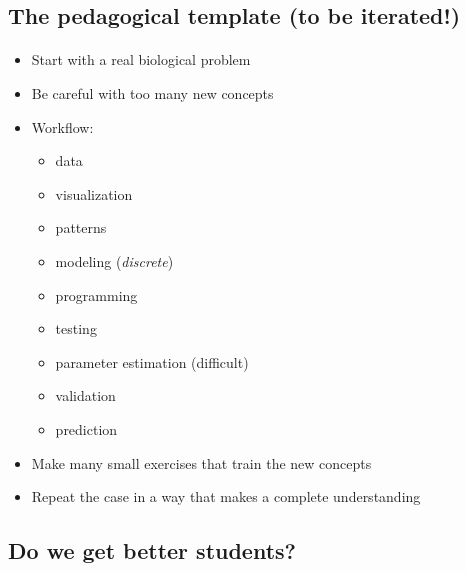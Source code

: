 \documentclass[%
twoside,                 %
final,                   %
10pt]{article}
\begin{document}
\noindent




\subsection*{The pedagogical template (to be iterated!)}


\paragraph{}
\begin{itemize}
 \item Start with a real biological problem

 \item Be careful with too many new concepts

 \item Workflow:
\begin{itemize}

  \item data

  \item visualization

  \item patterns

  \item modeling (\emph{discrete})

  \item programming

  \item testing

  \item parameter estimation (difficult)

  \item validation

  \item prediction

\end{itemize}

\noindent
 \item Make many small exercises that train the new concepts

 \item Repeat the case in a way that makes a complete understanding
\end{itemize}

\noindent




\subsection*{Do we get better students?}
\end{document}
